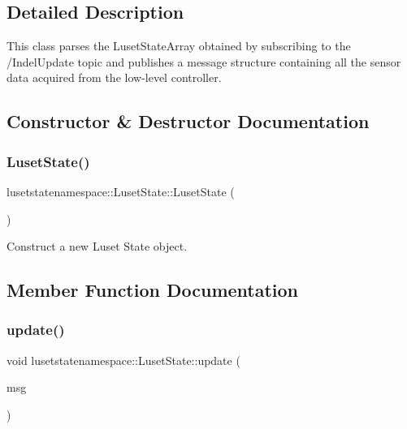 \subsection{Detailed Description}
This class parses the Luset\+State\+Array obtained by subscribing to the /\+Indel\+Update topic and publishes a message structure containing all the sensor data acquired from the low-\/level controller. 

\subsection{Constructor \& Destructor Documentation}
\mbox{\label{classlusetstatenamespace_1_1LusetState_a56014a12eb93b94767ff6100eae715f1}} 
\subsubsection{\texorpdfstring{Luset\+State()}{LusetState()}}
{\footnotesize\ttfamily lusetstatenamespace\+::\+Luset\+State\+::\+Luset\+State (\begin{DoxyParamCaption}{ }\end{DoxyParamCaption})}



Construct a new Luset State object. 



\subsection{Member Function Documentation}
\mbox{\label{classlusetstatenamespace_1_1LusetState_a47cade12b97053f9c4432cc629300299}} 
\subsubsection{\texorpdfstring{update()}{update()}}
{\footnotesize\ttfamily void lusetstatenamespace\+::\+Luset\+State\+::update (\begin{DoxyParamCaption}\item[{const indel\+\_\+update\+\_\+pkg\+::\+Luset\+State\+Array\+::\+Const\+Ptr \&}]{msg }\end{DoxyParamCaption})}



